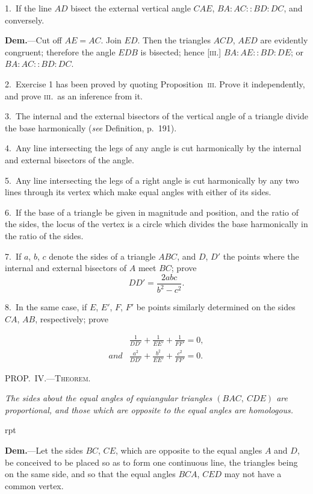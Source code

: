 \documentclass[oneside]{book}
\newcommand\mypropl[2]{
\bigskip\Needspace*{4\baselineskip}\begin{center}\textsc{#1}\end{center}
\hspace{\parindent}\emph{#2}\par\medskip
}
\newcommand\imgflow[3]{
\setcounter{wrapwidth}{#1}
\begin{wrapfigure}[#2]{r}{\value{wrapwidth}pt}
\begin{center}
\vspace{-0.3in}
\end{center}
\end{wrapfigure}
}
\begin{document}
\begin{footnotesize}
1.~If the line $AD$ bisect the external vertical angle $CAE$,
$BA : AC :: BD : DC$, and conversely.

\textbf{Dem.}---Cut off $AE = AC$. Join
$ED$. Then the triangles $ACD$,
$AED$ are evidently congruent;
therefore the angle $EDB$ is bisected;
hence [\textsc{iii}.] $BA : AE ::
BD : DE$; or $BA : AC :: BD : DC$.

2.~Exercise 1 has been proved
by quoting Proposition~\textsc{iii}. Prove
it independently, and prove \textsc{iii}.\ as an inference from it.

3.~The internal and the external bisectors of the vertical angle
of a triangle divide the base harmonically (\textit{see} Definition, p.~191).

4.~Any line intersecting the legs of any angle is cut harmonically
by the internal and external bisectors of the angle.

5.~Any line intersecting the legs of a right angle is cut harmonically
by any two lines through its vertex which make equal
angles with either of its sides.

6.~If the base of a triangle be given in magnitude and position,
and the ratio of the sides, the locus of the vertex is a circle which
divides the base harmonically in the ratio of the sides.

7.~If $a$, $b$, $c$ denote the sides of a triangle $ABC$, and $D$, $D'$ the
points where the internal and external bisectors of $A$ meet $BC$;
prove
\[
DD'=\frac{2abc}{b^2-c^2}.
\]

8.~In the same case, if $E$, $E'$, $F$, $F'$ be points similarly determined
on the sides $CA$, $AB$, respectively; prove

\begin{align*}
&\frac{1}{DD'}+\frac{1}{EE'}+\frac{1}{FF'}=0,\\
and &\frac{a^2}{DD'}+\frac{b^2}{EE'}+\frac{c^2}{FF'}=0.
\end{align*}
\par\end{footnotesize}

\mypropl{PROP\@.~IV\@.---Theorem.}{The sides about the equal angles of equiangular triangles
$(BAC,\ CDE)$ are proportional, and those which
are opposite to the equal angles are homologous.}

\imgflow{125}{8}{f173}

\textbf{Dem.}---Let the sides $BC$, $CE$, which are opposite to
the equal angles $A$ and $D$, be conceived to be placed so
as to form one continuous line,
the triangles being on the same
side, and so that the equal
angles $BCA$, $CED$ may not
have a common vertex.
\end{document}
